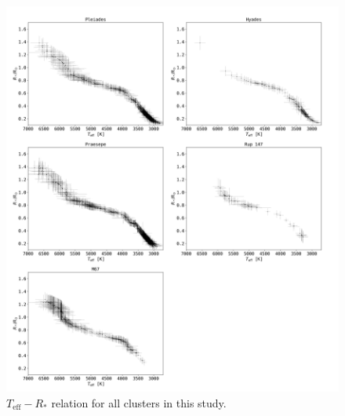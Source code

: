 \documentclass{aa}
\begin{document}
   \begin{figure}
		\centering
           \includegraphics[width=\hsize]{pics/clusters/teff_R.png}

      \caption{$T_\mathrm{eff}-R_*$ relation for all clusters in this study.}
         \label{fig:teff_radius}
   \end{figure}   

\end{document}
